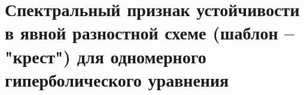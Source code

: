 \documentclass[__main__.tex]{subfiles}
\begin{document}
\section{Спектральный признак устойчивости в явной разностной схеме (шаблон -- "крест") для одномерного гиперболического уравнения}
\end{document}
